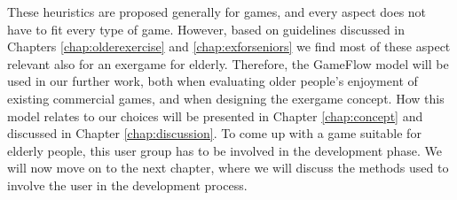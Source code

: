 These heuristics are proposed generally for games, and every aspect does not have to fit every type of game. However, based on guidelines discussed in Chapters \ref{chap:olderexercise} and \ref{chap:exforseniors} we find most of these aspect relevant also for an exergame for elderly. Therefore, the GameFlow model will be used in our further work, both when evaluating older people's enjoyment of existing commercial games, and when designing the exergame concept. How this model relates to our choices will be presented in Chapter \ref{chap:concept} and discussed in Chapter \ref{chap:discussion}. To come up with a game suitable for elderly people, this user group has to be involved in the development phase. We will now move on to the next chapter, where we will discuss the methods used to involve the user in the development process.
